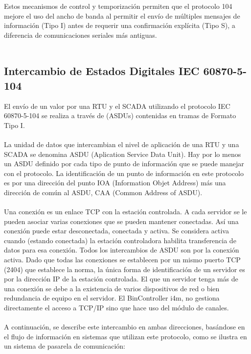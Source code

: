 \documentclass[a5paper]{book}%
\begin{document}
Estos mecanismos de control y temporización permiten que el protocolo 104 mejore el uso del ancho de banda al permitir el envío de múltiples mensajes de información (Tipo I) antes de requerir una confirmación explícita (Tipo S), a diferencia de comunicaciones seriales más antiguas.\\\\

\subsection{Intercambio de Estados Digitales IEC 60870-5-104}

El envío de un valor por una RTU y el SCADA utilizando el protocolo IEC 60870-5-104 se realiza a través de (ASDUs) contenidas en tramas de Formato Tipo I.\\\\

La unidad de datos que intercambian el nivel de aplicación de una RTU y una SCADA se denomina ASDU (Aplication Service Data Unit). Hay por lo menos un ASDU definido por cada tipo de punto de información que se puede manejar con el protocolo. La identificación de un punto de información en este protocolo es por una dirección del punto IOA (Information Objet Address) más una dirección de común al ASDU, CAA (Common Address of ASDU).\\\\


Una conexión es un enlace TCP con la estación controlada. A cada servidor se le pueden asociar varias conexiones que se pueden mantener conectadas. Así una conexión puede estar desconectada, conectada y activa. Se considera activa cuando (estando conectada) la estación controladora habilita transferencia de datos para esa conexión. Todos los intercambios de ASDU son por la conexión activa. Dado que todas las conexiones se establecen por un mismo puerto TCP (2404) que establece la norma, la única forma de identificación de un servidor es por la dirección IP de la estación controlada. El que un servidor tenga más de una conexión se debe a la existencia de varios dispositivos de red o
bien redundancia de equipo en el servidor. El BinController i4m, no gestiona directamente el acceso a TCP/IP sino que hace uso del módulo de canales.\\\\

A continuación, se describe este intercambio en ambas direcciones, basándose en el flujo de información en sistemas que utilizan este protocolo, como se ilustra en un sistema de pasarela de comunicación:
\end{document}
